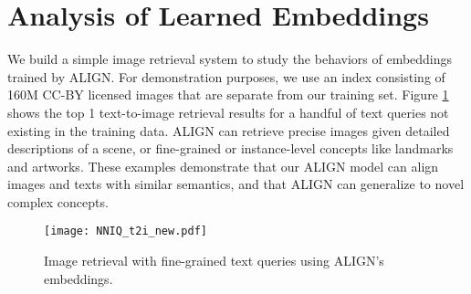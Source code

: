\documentclass{article}
\begin{document}
\begin{table}[h!]
\vspace{-5mm}
    \centering
    \small
    \caption{Tradeoff between training data size and quality.}
    \label{tab:ablation_data_tradeoff}
    \vspace{1mm}
\vspace{-5mm}
\end{table}



\section{Analysis of Learned Embeddings}

We build a simple image retrieval system to study the behaviors of embeddings trained by ALIGN. For demonstration purposes, we use an index consisting of 160M CC-BY licensed images that are separate from our training set. Figure \ref{fig:nniq_t2i} shows the top 1 text-to-image retrieval results for a handful of text queries not existing in the training data. ALIGN can retrieve precise images given detailed descriptions of a scene, or fine-grained or instance-level concepts like landmarks and artworks. These examples demonstrate that our ALIGN model can align images and texts with similar semantics, and that ALIGN can generalize to novel complex concepts.

\begin{figure}[!htb]
\vspace{-1mm}
\begin{center}
    \centerline{\texttt{[image: NNIQ\_t2i\_new.pdf]}}
    \vskip -0.1in
    \caption{Image retrieval with fine-grained text queries using ALIGN's embeddings.}
    \label{fig:nniq_t2i}
\end{center}
\vspace{-6mm}
\end{figure}
\end{document}
